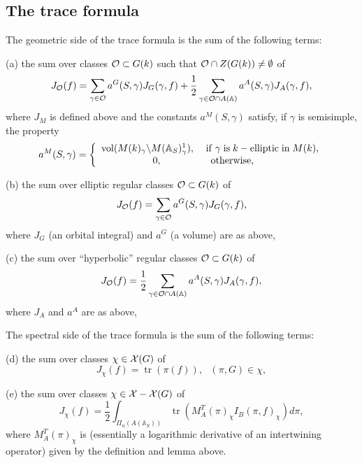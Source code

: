 \documentclass[12pt,letterpaper]{book}
\theoremstyle{plain}
\theoremstyle{definition}
\theoremstyle{remark}
\theoremstyle{remark}
\newcommand{\tr}{\operatorname{tr}}
\begin{document}
\subsection{The trace formula}

The geometric side of the trace formula is the sum of the following terms:

(a) the sum over classes ${\cal{O}}\subset G(k)$
such that ${\cal{O}}\cap Z(G(k))\not= \emptyset$ of
\begin{equation}
J_{\cal{O}}(f)=
\sum_{\gamma\in {\cal O}}
a^G(S,\gamma)J_G(\gamma,f)
+{\frac{1}{2}}\sum_{\gamma\in {\cal O}\cap A({\mathbb A})}
a^A(S,\gamma)J_A(\gamma,f),
\end{equation}
where $J_M$ is defined above and
the constants $a^M(S,\gamma )$ satisfy, if $\gamma$ is semisimple,
the property
\[
a^M(S,\gamma )=\left\{
\begin{array}{c}
\operatorname{vol}(M(k)_\gamma \backslash M({\mathbb {A}}_S)_\gamma ^1),
\;\;\;\;{\rm if\;}\gamma \;{\rm is}\;
k-{\rm elliptic\;in}\;M(k), \\
0,\;\;\;\;\;\;\;\;\;\;\;\;\;\;\;\;\;\;{\rm otherwise},\;\;\;\;\;
\end{array}
\right.
\]

(b) the sum over elliptic regular classes ${\cal{O}}\subset G(k)$
of
\begin{equation}
J_{\cal{O}}(f)=
\sum_{\gamma\in {\cal O}}
a^G(S,\gamma)J_G(\gamma,f),
\end{equation}
where $J_G$ (an orbital integral) and $a^G$ (a volume)
are as above,

(c) the sum over ``hyperbolic'' regular classes
${\cal{O}}\subset G(k)$
of
\begin{equation}
J_{\cal{O}}(f)=
{\frac{1}{2}}\sum_{\gamma\in {\cal O}\cap A({\mathbb A})}
a^A(S,\gamma)J_A(\gamma,f),
\end{equation}
where $J_A$ and $a^A$ are as above,

The spectral side of the trace formula is the sum of the following terms:

(d) the sum over classes $\chi\in {\cal{X}}(G)$ of
\begin{equation}
J_\chi(f)=
\tr(\pi(f)),\ \ \ (\pi,G)\in\chi,
\end{equation}

(e) the sum over classes $\chi\in {\cal{X}}-{\cal{X}}(G)$ of
\begin{equation}
J_\chi(f)=
{\frac{1}{2}}\int_{\Pi_u(A({\mathbb{A}}_S))}
\tr(M_A^T(\pi)_\chi
I_B(\pi,f)_\chi)d\pi,
\end{equation}
where $M_A^T(\pi)_\chi$ is (essentially a logarithmic derivative
of an intertwining operator) given by the definition and lemma above.
\end{document}
